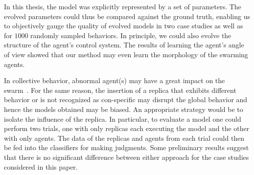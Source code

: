 In this thesis, the model was explicitly represented by a set of parameters. The evolved parameters could thus be compared against the ground truth, enabling us to objectively gauge the quality of evolved models in two case studies as well as for $1000$ randomly sampled behaviors. In principle, we could also evolve the structure of the agent's control system. The results of learning the agent's angle of view showed that our method may even learn the morphology of the swarming agents.

In collective behavior, abnormal agent(s) may have a great impact on the swarm~\cite{Bjerknes2013}. For the same reason, the insertion of a replica that exhibits different behavior or is not recognized as con-specific may disrupt the global behavior and hence the models obtained may be biased. An appropriate strategy would be to isolate the influence of the replica. In particular, to evaluate a model one could perform two trials, one with only replicas each executing the model and the other with only agents. The data of the replicas and agents from each trial could then be fed into the classifiers for making judgments. Some preliminary results suggest that there is no significant difference between either approach for the case studies considered in this paper.

